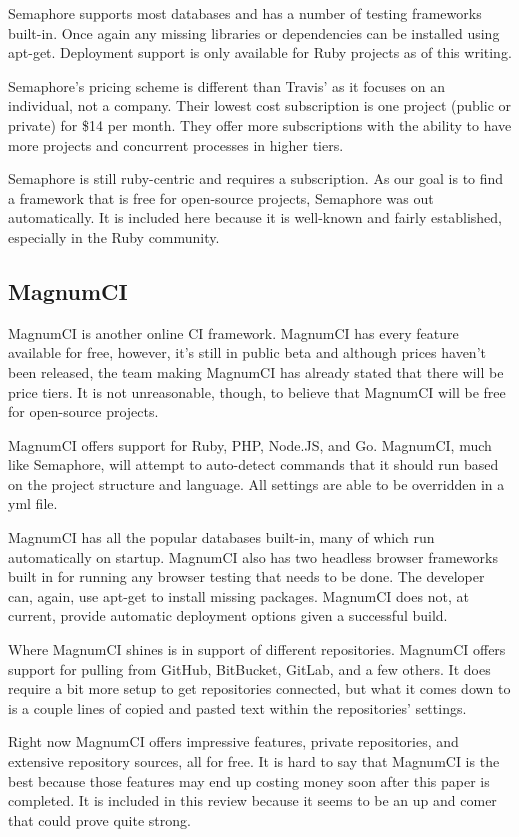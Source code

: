 \documentclass[12pt]{ucthesis}
\begin{document}
Semaphore supports most databases and has a number of testing frameworks built-in. Once again any missing libraries or dependencies can be installed using apt-get. Deployment support is only available for Ruby projects as of this writing.

Semaphore's pricing scheme is different than Travis' as it focuses on an individual, not a company. Their lowest cost subscription is one project (public or private) for \$14 per month. They offer more subscriptions with the ability to have more projects and concurrent processes in higher tiers.

Semaphore is still ruby-centric and requires a subscription. As our goal is to find a framework that is free for open-source projects, Semaphore was out automatically. It is included here because it is well-known and fairly established, especially in the Ruby community.

\subsection{MagnumCI}
MagnumCI \cite{MagnumCI} is another online CI framework. MagnumCI has every feature available for free, however, it's still in public beta and although prices haven't been released, the team making MagnumCI has already stated that there will be price tiers. It is not unreasonable, though, to believe that MagnumCI will be free for open-source projects.

MagnumCI offers support for Ruby, PHP, Node.JS, and Go. MagnumCI, much like Semaphore, will attempt to auto-detect commands that it should run based on the project structure and language. All settings are able to be overridden in a yml file.

MagnumCI has all the popular databases built-in, many of which run automatically on startup. MagnumCI also has two headless browser frameworks built in for running any browser testing that needs to be done. The developer can, again, use apt-get to install missing packages. MagnumCI does not, at current, provide automatic deployment options given a successful build.

Where MagnumCI shines is in support of different repositories. MagnumCI offers support for pulling from GitHub, BitBucket, GitLab, and a few others. It does require a bit more setup to get repositories connected, but what it comes down to is a couple lines of copied and pasted text within the repositories' settings.

Right now MagnumCI offers impressive features, private repositories, and extensive repository sources, all for free. It is hard to say that MagnumCI is the best because those features may end up costing money soon after this paper is completed. It is included in this review because it seems to be an up and comer that could prove quite strong.
\end{document}
